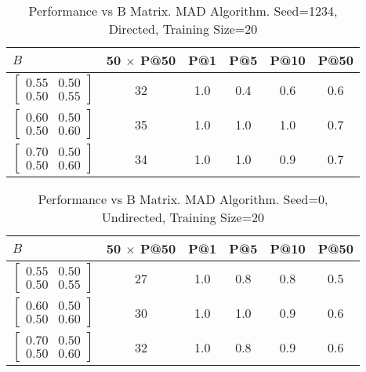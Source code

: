 \documentclass{tufte-handout}
\begin{document}
\begin{table}[htbp]
  \begin{tabular}{l c c c c c}
    $B$ & 50 $\times$ P@50 & P@1 & P@5 & P@10 & P@50 \\ \toprule
  $\begin{bmatrix} 0.55 & 0.50 \\0.50 &0.55 \end{bmatrix}$ & 32 & 1.0 & 0.4 & 0.6 & 0.6 \\
  $\begin{bmatrix} 0.60 & 0.50 \\0.50 &0.60 \end{bmatrix}$ & 35 & 1.0 & 1.0 & 1.0 & 0.7 \\
  $\begin{bmatrix} 0.70 & 0.50 \\0.50 &0.60 \end{bmatrix}$ & 34 & 1.0 & 1.0 & 0.9 & 0.7 \\
  \end{tabular}
  \caption{Performance vs B Matrix. MAD Algorithm. Seed=1234, Directed, Training Size=20}
  \label{tab:perf-vs-b}
\end{table}

\begin{table}[htbp]
  \begin{tabular}{l c c c c c}
    $B$ & 50 $\times$ P@50 & P@1 & P@5 & P@10 & P@50 \\ \toprule
  $\begin{bmatrix} 0.55 & 0.50 \\0.50 &0.55 \end{bmatrix}$ & 27 & 1.0 & 0.8 & 0.8 & 0.5 \\
  $\begin{bmatrix} 0.60 & 0.50 \\0.50 &0.60 \end{bmatrix}$ & 30 & 1.0 & 1.0 & 0.9 & 0.6 \\
  $\begin{bmatrix} 0.70 & 0.50 \\0.50 &0.60 \end{bmatrix}$ & 32 & 1.0 & 0.8 & 0.9 & 0.6 \\
  \end{tabular}
  \caption{Performance vs B Matrix. MAD Algorithm. Seed=0, Undirected, Training Size=20}
  \label{tab:perf-vs-b}
\end{table}
\end{document}
